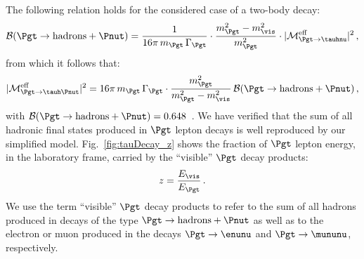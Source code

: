 The following relation holds for the considered case of a two-body decay:
\begin{equation}
\mathcal{B}(\Pgt \to \textrm{hadrons} + \Pnut) = \frac{1}{16 \pi \, m_{\Pgt} \, \Gamma_{\Pgt}} \cdot \frac{m_{\Pgt}^{2} - m_{\vis}^{2}}{m_{\Pgt}^{2}} \cdot \vert \mathcal{M}^{\textrm{eff}}_{\Pgt \to
  \tauhnu} \vert^{2} \, ,
\end{equation}
from which it follows that:
\begin{equation}
\vert \mathcal{M}^{\textrm{eff}}_{\Pgt \to \tauh\Pnut} \vert^{2} = 16 \pi \, m_{\Pgt} \, \Gamma_{\Pgt} 
  \cdot \frac{m_{\Pgt}^{2}}{m_{\Pgt}^{2} - m_{\vis}^{2}} \, \mathcal{B}(\Pgt \to \textrm{hadrons} + \Pnut) \, , 
\end{equation}
with $\mathcal{B}(\Pgt \to \textrm{hadrons} + \Pnut) = 0.648$~\cite{PDG}.
We have verified that the sum of all hadronic final states produced in $\Pgt$ lepton decays
is well reproduced by our simplified model.
Fig.~\ref{fig:tauDecay_z} shows the fraction of $\Pgt$ lepton energy,
in the laboratory frame, carried by the ``visible'' $\Pgt$ decay
products:
\begin{equation}
z = \frac{E_{\vis}}{E_{\Pgt}} \, .
\label{eq:def_z}
\end{equation}
We use the term ``visible'' $\Pgt$ decay products to refer to the sum
of all hadrons produced in decays of the type $\Pgt \to \textrm{hadrons} + \Pnut$ 
as well as to the electron or muon produced in the decays $\Pgt \to \enunu$ and $\Pgt \to \mununu$, respectively.

